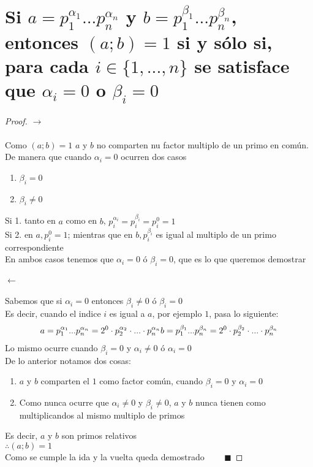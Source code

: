 \section{Si $a = p_1^{\alpha_1}...p_n^{\alpha_n}$ y $b = p_1^{\beta_1}...p_n^{\beta_n}$, entonces $(a;b) = 1$ si y sólo si, para cada $i \in \{1, ...,n\}$ se satisface que $\alpha_i = 0$ o $\beta_i = 0$}
    \begin{proof}
        $\rightarrow$ \\ \\
        Como $(a;b) = 1$ $a$ y $b$ no comparten nu factor multiplo de un primo en común. \\
        De manera que cuando $\alpha_i = 0$ ocurren dos casos
        \begin{enumerate}
            \item $\beta_i = 0$
            \item $\beta_i \neq 0$
        \end{enumerate}
        Si 1. tanto en $a$ como en $b$, $p_i^{\alpha_i} = p_i^{\beta_i} = p_i^0 = 1$ \\
        Si 2. en $a, p_i^0 = 1$; mientras que en $b, p_i^{\beta_i}$ es igual al multiplo de un primo correspondiente \\
        En ambos casos tenemos que $\alpha_i = 0$ ó $\beta_i=0$, que es lo que queremos demostrar
        \\ \\ $\leftarrow$ \\ \\
        Sabemos que si $\alpha_i = 0$ entonces $\beta_i \neq 0$ ó $\beta_i=0$ \\
        Es decir, cuando el indice $i$ es igual a $a$, por ejemplo $1$, pasa lo siguiente:
        \begin{align}
            \notag a = p_1^{\alpha_1} ... p_n^{\alpha_n} = 2^0 \cdot p_2^{\alpha_2} \cdot ... \cdot p_n^{\alpha_n}
            \notag b = p_1^{\beta_1} ... p_n^{\beta_n} = 2^0 \cdot p_2^{\beta_2} \cdot ... \cdot p_n^{\beta_n}
        \end{align}
        Lo mismo ocurre cuando $\beta_i = 0$ y $\alpha_i \neq 0$ ó $\alpha_i = 0$ \\
        De lo anterior notamos dos cosas:
        \begin{enumerate}
            \item $a$ y $b$ comparten el $1$ como factor común, cuando $\beta_i=0$ y $\alpha_i=0$
            \item Como nunca ocurre que $\alpha_i \neq 0$ y $\beta_i \neq 0$, $a$ y $b$ nunca tienen como multiplicandos al mismo multiplo de primos \\
        \end{enumerate}
        Es decir, $a$ y $b$ son primos relativos \\
            $\therefore (a;b) = 1$ \\
            Como se cumple la ida y la vuelta queda demostrado $\qquad \blacksquare$
    \end{proof} 
    